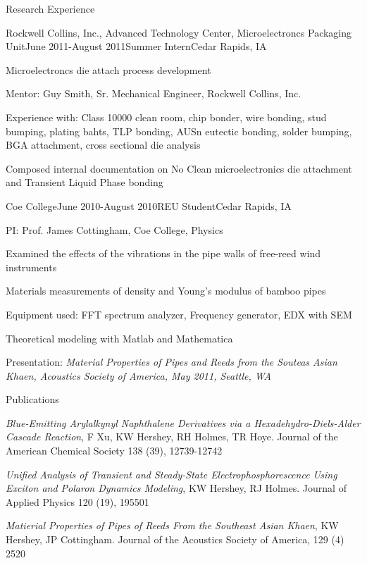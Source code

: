 \documentclass{resume} %
\begin{document}
\begin{rSection}{Research Experience}

\begin{rSubsection}{Rockwell Collins, Inc., Advanced Technology Center, Microelectroncs Packaging Unit}{June 2011-August 2011}{Summer Intern}{Cedar Rapids, IA}
\item Microelectroncs die attach process development
\item Mentor: Guy Smith, Sr. Mechanical Engineer, Rockwell Collins, Inc.
\item Experience with: Class 10000 clean room, chip bonder, wire bonding, stud bumping, plating bahts, TLP bonding, AUSn eutectic bonding, solder bumping, BGA attachment, cross sectional die analysis
\item Composed internal documentation on  No Clean microelectronics die attachment and Transient Liquid Phase bonding
\end{rSubsection}


\begin{rSubsection}{Coe College}{June 2010-August 2010}{REU Student}{Cedar Rapids, IA}
\item PI: Prof. James Cottingham, Coe College, Physics 
\item Examined the effects of the vibrations in the pipe walls of free-reed wind instruments
\item Materials measurements of density and Young's modulus of bamboo pipes
\item Equipment used: FFT spectrum analyzer, Frequency generator, EDX with SEM
\item Theoretical modeling with Matlab and Mathematica
\item Presentation: {\em Material Properties of Pipes and Reeds from the Souteas Asian Khaen, Acoustics Society of America, May 2011, Seattle, WA}
\end{rSubsection}

\end{rSection}


\begin{rSection}{Publications}
\item {\em Blue-Emitting Arylalkynyl Naphthalene Derivatives via a Hexadehydro-Diels-Alder Cascade Reaction}, F Xu, KW Hershey, RH Holmes, TR Hoye. Journal of the American Chemical Society 138 (39), 12739-12742
\item {\em Unified Analysis of Transient and Steady-State Electrophosphorescence Using Exciton and Polaron Dynamics Modeling}, KW Hershey, RJ Holmes. Journal of Applied Physics 120 (19), 195501
\item {\em Matierial Properties of Pipes of Reeds From the Southeast Asian Khaen}, KW Hershey, JP Cottingham. Journal of the Acoustics Society of America, 129 (4) 2520

\end{rSection}
\end{document}
